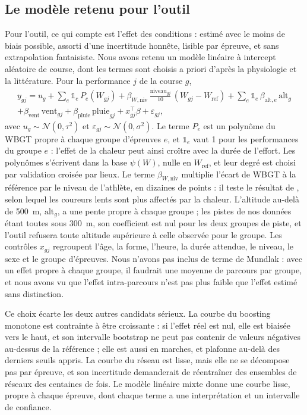 \documentclass[11pt,a4paper]{article}
\begin{document}
\subsection{Le modèle retenu pour l'outil}\label{sec:modele_outil}

Pour l'outil, ce qui compte est l'effet des conditions : estimé avec le moins de biais possible, assorti d'une
incertitude honnête, lisible par épreuve, et sans extrapolation fantaisiste. Nous avons retenu un modèle linéaire à
intercept aléatoire de course, dont les termes sont choisis a priori d'après la physiologie et la littérature. Pour la
performance $j$ de la course $g$,
\begin{multline}\label{eq:modele_outil}
y_{gj} = u_g + \sum_e \mathbb 1_e\,P_e(W_{gj}) + \beta_{W,\text{niv}}\,\frac{\text{niveau}_{gj}}{10}\,(W_{gj} - W_{\text{ref}})
+ \sum_e \mathbb 1_e\,\beta_{\text{alt},e}\,\text{alt}_g \\
+ \beta_{\text{vent}}\,\text{vent}_{gj} + \beta_{\text{pluie}}\,\text{pluie}_{gj} + x_{gj}^\top\beta + \varepsilon_{gj},
\end{multline}
avec $u_g \sim \mathcal N(0, \tau^2)$ et $\varepsilon_{gj} \sim \mathcal N(0, \sigma^2)$. Le terme $P_e$ est un
polynôme du WBGT propre à chaque groupe d'épreuves $e$, et $\mathbb 1_e$ vaut 1 pour les performances du groupe $e$ :
l'effet de la chaleur peut ainsi croître avec la durée de l'effort. Les polynômes s'écrivent dans la base $\psi(W)$,
nulle en $W_{\text{ref}}$, et leur degré est choisi par validation croisée par lieux. Le terme $\beta_{W,\text{niv}}$
multiplie l'écart de WBGT à la référence par le niveau de l'athlète, en dizaines de points : il teste le résultat de
\citet{ely2007}, selon lequel les coureurs lents sont plus affectés par la chaleur. L'altitude au-delà de 500~m,
$\text{alt}_g$, a une pente propre à chaque groupe ; les pistes de nos données étant toutes sous 300~m, son
coefficient est nul pour les deux groupes de piste, et l'outil refusera toute altitude supérieure à celle observée
pour le groupe. Les contrôles $x_{gj}$ regroupent l'âge, la forme, l'heure, la durée attendue, le niveau, le sexe et le
groupe d'épreuves. Nous n'avons pas inclus de terme de Mundlak : avec un effet propre à chaque groupe, il faudrait une
moyenne de parcours par groupe, et nous avons vu que l'effet intra-parcours n'est pas plus faible que l'effet estimé
sans distinction.

Ce choix écarte les deux autres candidats sérieux. La courbe du boosting monotone est contrainte à être croissante :
si l'effet réel est nul, elle est biaisée vers le haut, et son intervalle bootstrap ne peut pas contenir de valeurs
négatives au-dessus de la référence ; elle est aussi en marches, et plafonne au-delà des derniers seuils appris. La
courbe du réseau est lisse, mais elle ne se décompose pas par épreuve, et son incertitude demanderait de réentraîner
des ensembles de réseaux des centaines de fois. Le modèle linéaire mixte donne une courbe lisse, propre à chaque
épreuve, dont chaque terme a une interprétation et un intervalle de confiance.
\end{document}
